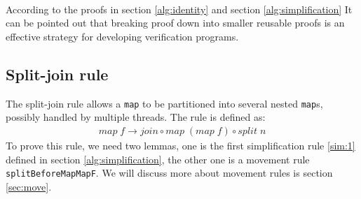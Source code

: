 \documentclass{l4proj}
\begin{document}
\begin{code}
\AgdaSymbol{:}%
\>[896I]\AgdaSymbol{(}\AgdaSpace{}%
\AgdaSymbol{:}\AgdaSpace{}%
\AgdaSymbol{)}\AgdaSpace{}%
\AgdaSpace{}%
\AgdaSymbol{\{}\AgdaSpace{}%
\AgdaSymbol{:}\AgdaSpace{}%
\AgdaSymbol{\}}\AgdaSpace{}%
\AgdaSpace{}%
\AgdaSymbol{\{}\AgdaSpace{}%
\AgdaSymbol{:}\AgdaSpace{}%
\AgdaSymbol{\}}\AgdaSpace{}%
\AgdaSpace{}%
\AgdaSymbol{(}\AgdaSpace{}%
\AgdaSymbol{:}\AgdaSpace{}%
\AgdaSpace{}%
\AgdaSpace{}%
\AgdaSymbol{)}\AgdaSpace{}%
\AgdaSpace{}%
\AgdaSymbol{(}\AgdaSpace{}%
\AgdaSymbol{:}\AgdaSpace{}%
\AgdaSpace{}%
\AgdaSpace{}%
\AgdaSymbol{)}\AgdaSpace{}%
\<%
\\
\>[.][@{}l@{}]\<[896I]%
\>[10]\AgdaSpace{}%
\AgdaSpace{}%
\AgdaSymbol{(}\AgdaSpace{}%
\AgdaOperator{\AgdaFunction{++}}\AgdaSpace{}%
\AgdaSymbol{)}\AgdaSpace{}%
\AgdaSpace{}%
\<%
\\
\>[0]\AgdaSpace{}%
\AgdaSpace{}%
\AgdaInductiveConstructor{[]}\AgdaSpace{}%
\AgdaSpace{}%
\AgdaSymbol{=}\AgdaSpace{}%
\<%
\\
\>[0]\AgdaSpace{}%
\AgdaSymbol{(}\AgdaSpace{}%
\AgdaSymbol{)}\AgdaSpace{}%
\AgdaSymbol{(}\AgdaSpace{}%
\AgdaSpace{}%
\AgdaSymbol{)}\AgdaSpace{}%
\AgdaSpace{}%
\AgdaSymbol{=}\AgdaSpace{}%
\AgdaSpace{}%
\AgdaSpace{}%
\AgdaSpace{}%
\<%
\end{code}
According to the proofs in section \ref{alg:identity} and section \ref{alg:simplification} It can be pointed out that breaking proof down into smaller reusable proofs is an effective strategy for developing verification programs.

\subsection{Split-join rule}
\label{alg:splitjoin}
The split-join rule allows a \texttt{map} to be partitioned into several nested \texttt{map}s, possibly handled by multiple threads. The rule is defined as:
\begin{align}
\label{split-join}
    map\; f \to join \circ map\; (map\; f) \circ split\; n
\end{align}
To prove this rule, we need two lemmas, one is the first simplification rule \ref{sim:1} defined in section \ref{alg:simplification}, the other one is a movement rule \texttt{splitBeforeMapMapF}. We will discuss more about movement rules is section \ref{sec:move}. 
\end{document}
